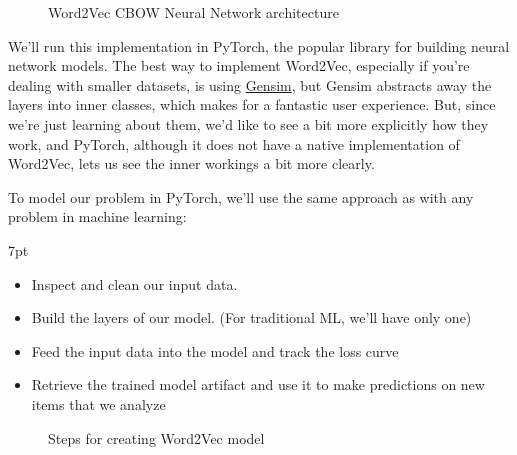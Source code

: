 \documentclass[11pt, table]{diazessay} %
\newenvironment{formal}{%
  \def\FrameCommand{%
	\hspace{1pt}%
	{\color{w_lightblue}\vrule width 2pt}%
	{\color{formalshade}\vrule width 4pt}%
	\colorbox{formalshade}%
  }%
  \MakeFramed{\advance\hsize-\width\FrameRestore}%
  \noindent\hspace{-4.55pt}%
  \begin{adjustwidth}{}{7pt}%
  \vspace{2pt}\vspace{2pt}%
}
{%
  \vspace{2pt}\end{adjustwidth}\endMakeFramed%
}
\begin{document}
\begin{sloppypar}
\begin{figure}[H]
\caption{Word2Vec CBOW Neural Network architecture}
\end{figure}

We'll run this implementation in PyTorch, the popular library for building neural network models. The best way to implement Word2Vec, especially if you're dealing with smaller datasets, is using \hyperlink{https://radimrehurek.com/gensim/}{Gensim}, but Gensim abstracts away the layers into inner classes, which makes for a fantastic user experience. But, since we're just learning about them, we'd like to see a bit more explicitly how they work, and PyTorch, although it does not have a native implementation of Word2Vec, lets us see the inner workings a bit more clearly.

To model our problem in PyTorch, we'll use the same approach as with any problem in machine learning:

\begin{formal}
\begin{itemize}
  \item Inspect and clean our input data.
  \item Build the layers of our model. (For traditional ML, we'll have only one)
  \item Feed the input data into the model and track the loss curve
  \item Retrieve the trained model artifact and use it to make predictions  on new items that we analyze
\end{itemize}
\end{formal}

\begin{figure}[H]
   	 \caption{Steps for creating Word2Vec model}
      \end{figure}
	 

\end{sloppypar}
\end{document}
